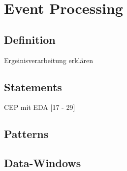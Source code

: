 \chapter{Event Processing}

\section{Definition}

Ergeinisverarbeitung erklären
\cite[]{bruns2010event}

\section{Statements}

CEP mit EDA
\cite{EsperRef2018}[17 - 29]

\section{Patterns}

\section{Data-Windows}
